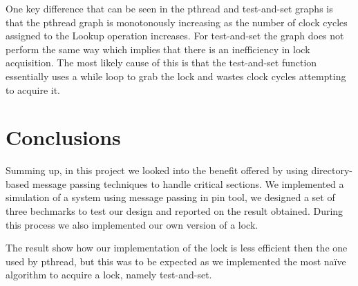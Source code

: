 \documentclass{article}
\begin{document}
One key difference that can be seen in the pthread and test-and-set graphs is that the pthread graph is monotonously increasing as the number of clock cycles assigned to the Lookup operation increases.
For test-and-set the graph does not perform the same way which implies that there is an inefficiency in lock acquisition.  
The most likely cause of this is that the test-and-set function essentially uses a while loop to grab the lock and wastes clock cycles attempting to acquire it.

\section{Conclusions}\label{sec:conclusion}

Summing up, in this project we looked into the benefit offered by using directory-based message passing techniques to handle critical sections. We implemented a simulation of a system using message passing in pin tool, we designed a set of three bechmarks to test our design and reported on the result obtained. During this process we also implemented our own version of a lock.

The result show how our implementation of the lock is less efficient then the one used by pthread, but this was to be expected as we implemented the most na{\"i}ve algorithm to acquire a lock, namely test-and-set.




\end{document}
